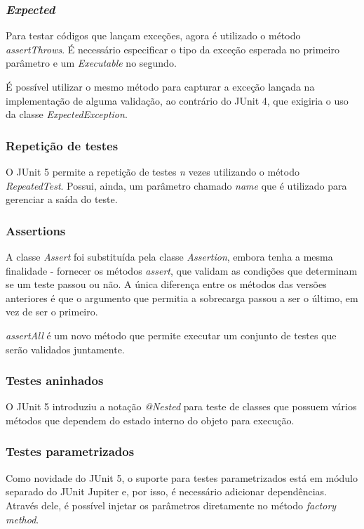         \subsubsection{\textit{Expected}}
        Para testar códigos que lançam exceções, agora é utilizado o método \textit{assertThrows}. É necessário especificar o tipo da exceção esperada no primeiro parâmetro e um \textit{Executable} no segundo.
        \newline
        \par É possível utilizar o mesmo método para capturar a exceção lançada na implementação de alguma validação, ao contrário do JUnit 4, que exigiria o uso da classe \textit{ExpectedException}.
        \subsubsection{Repetição de testes}
        O JUnit 5 permite a repetição de testes \textit{n} vezes utilizando o método \textit{RepeatedTest}. Possui, ainda, um parâmetro chamado \textit{name} que é utilizado para gerenciar a saída do teste.
        \subsubsection{Assertions}
        A classe \textit{Assert} foi substituída pela classe \textit{Assertion}, embora tenha a mesma finalidade - fornecer os métodos \textit{assert}, que validam as condições que determinam se um teste passou ou não. A única diferença entre os métodos das versões anteriores é que o argumento que permitia a sobrecarga passou a ser o último, em vez de ser o primeiro.
        \newline
        \par \textit{assertAll} é um novo método que permite executar um conjunto de testes que serão validados juntamente.
        \subsubsection{Testes aninhados}
        O JUnit 5 introduziu a notação \textit{@Nested} para teste de classes que possuem vários métodos que dependem do estado interno do objeto para execução.
        \subsubsection{Testes parametrizados}
        Como novidade do JUnit 5, o suporte para testes parametrizados está em módulo separado do JUnit Jupiter e, por isso, é necessário adicionar dependências. Através dele, é possível injetar os parâmetros diretamente no método \textit{factory method}.
